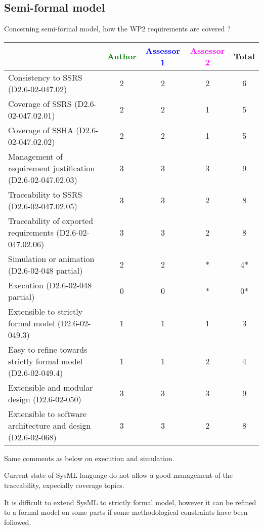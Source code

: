 \subsection{Semi-formal model}

Concerning semi-formal model, how the WP2 requirements are covered ?

\begin{tabular}{|l | c | c | c | c|}
\hline
& \textcolor{green}{Author} & \textcolor{blue}{Assessor 1} & \textcolor{magenta}{Assessor 2} & Total \\
\hline
Consistency to SSRS (D2.6-02-047.02) & 2 & 2 & 2 & 6 \\
\hline
Coverage of SSRS (D2.6-02-047.02.01) & 2 & 2 & 1 & 5 \\
\hline
Coverage of SSHA (D2.6-02-047.02.02) & 2 & 2 & 1 & 5 \\
\hline
Management of requirement justification (D2.6-02-047.02.03) & 3 & 3 & 3 & 9 \\
\hline
Traceability to SSRS (D2.6-02-047.02.05) & 3 & 3 & 2 & 8 \\
\hline
Traceability of exported requirements (D2.6-02-047.02.06) & 3 & 3 & 2 & 8 \\
\hline
Simulation or animation (D2.6-02-048 partial) & 2 & 2 &  * & 4* \\
\hline
Execution (D2.6-02-048 partial) & 0 & 0 & * & 0* \\
\hline
Extensible to strictly formal model (D2.6-02-049.3) & 1 & 1 & 1 & 3 \\
\hline
Easy to refine towards strictly formal model (D2.6-02-049.4) & 1 & 1 & 2 & 4 \\
\hline
Extensible and modular design (D2.6-02-050) & 3 & 3 & 3 & 9 \\
\hline
Extensible to software architecture and design (D2.6-02-068) & 3 & 3 & 2 & 8 \\
\hline
\end{tabular}



\begin{assessor2}
Same comments as below on execution and simulation.

Current state of SysML language do not allow a good management of the traceability, expecially coverage topics.

It is difficult to extend SysML to strictly formal model, however it can be refined to a formal model on some parts if some methodological constraints have been followed.
\end{assessor2}

